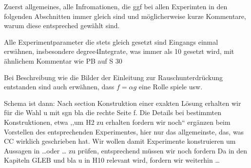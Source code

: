 



Zuerst allgemeines, alle Infromationen, die ggf bei allen Experimten in den 
folgenden Abschnitten immer gleich sind und möglicherweise kurze Kommentare,
warum diese entspreched gewählt sind.

\bigskip

Alle Experimentparameter die stets gleich gesetzt sind Eingangs einmal erwähnen,
insbesondere degree4Integrate, was immer als 10 gesetzt wird, mit ähnlichem 
Kommentar wie PB auf S 30


\bigskip

Bei Beschreibung wie die Bilder der Einleitung zur Rauschunterdrückung
entstanden sind auch erwähnen, dass $f=\alpha g$ eine Rolle spiele usw.


Schema ist dann: Nach section Konstruktion einer exakten Lösung erhalten wir
für die Wahl u mit sgn bla die rechte Seite f.
Die Details bei bestimmten Konstruktionen, etwa ,,um H2 zu erhalten fordern wir
noch`` ergänzen beim Vorstellen des entsprechenden Experimentes, hier nur das 
allgemeinste, das, was CC wirklich geschrieben hat.
Wir wollen damit Experimente konstruieren um Aussagen in \ldots oder \ldots
zu prüfen, entsprechend müssen wir noch fordern
Da in den Kapiteln GLEB und bla u in H10 relevant wird, fordern wir
weiterhin \ldots


